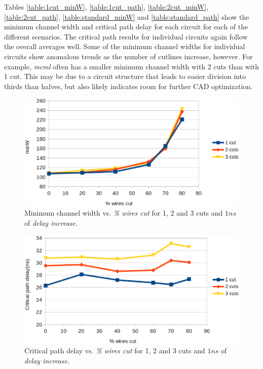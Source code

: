 \documentclass{sig-alternate-2013}
\begin{document}
Tables \ref{table:1cut_minW}, \ref{table:1cut_path}, \ref{table:2cut_minW}, \ref{table:2cut_path}, \ref{table:standard_minW} and \ref{table:standard_path} show the minimum channel width and critical path delay for each circuit for each of the different scenarios. The critical path results for individual circuits again follow the overall averages well. Some of the minimum channel widths for individual circuits show anomalous trends as the number of cutlines increase, however. For example, \textit{mcml} often has a smaller minimum channel width with 2 cuts than with 1 cut. This may be due to a circuit structure that leads to easier division into thirds than halves, but also likely indicates room for further CAD optimization.

\begin{figure}[!htbp]
\centering
\includegraphics[width=\linewidth]{cuts_minW.eps}
\caption{Minimum channel width vs. \textit{\% wires cut} for 1, 2 and 3 cuts and $1ns$ of \textit{delay increase}.}
\label{fig:cuts_minW}
\end{figure}

\begin{figure}[!htbp]
\centering
\includegraphics[width=\linewidth]{cuts_crit_path.eps}
\caption{Critical path delay vs. \textit{\% wires cut} for 1, 2 and 3 cuts and $1ns$ of \textit{delay increase}.}
\label{fig:cuts_crit}
\end{figure}
\end{document}
